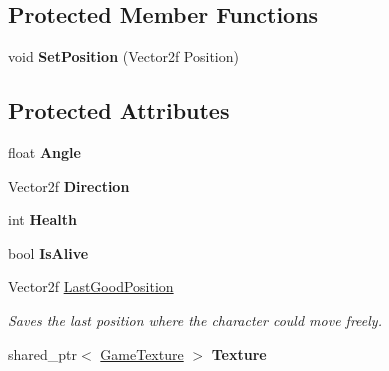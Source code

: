 \subsection*{Protected Member Functions}
\begin{DoxyCompactItemize}
\item 
\mbox{\label{class_engine_1_1_core_1_1_character_ad6e83da3df6620fedbe859022f68727f}} 
void {\bfseries Set\+Position} (Vector2f Position)
\end{DoxyCompactItemize}
\subsection*{Protected Attributes}
\begin{DoxyCompactItemize}
\item 
\mbox{\label{class_engine_1_1_core_1_1_character_ad98ac89b7c82b587306e83b5aa6acf07}} 
float {\bfseries Angle}
\item 
\mbox{\label{class_engine_1_1_core_1_1_character_aacac55c620345c41b3eb09f4abbd4318}} 
Vector2f {\bfseries Direction}
\item 
\mbox{\label{class_engine_1_1_core_1_1_character_a5f898cc76d7384b27f3105babb9ea27a}} 
int {\bfseries Health}
\item 
\mbox{\label{class_engine_1_1_core_1_1_character_a4b0c92ea505c26b00f1a4873bdf747b2}} 
bool {\bfseries Is\+Alive}
\item 
\mbox{\label{class_engine_1_1_core_1_1_character_ab749582f4376b908cdf23d6cc4ac2fe2}} 
Vector2f \hyperlink{class_engine_1_1_core_1_1_character_ab749582f4376b908cdf23d6cc4ac2fe2}{Last\+Good\+Position}
\begin{DoxyCompactList}\small\item\em Saves the last position where the character could move freely. \end{DoxyCompactList}\item 
\mbox{\label{class_engine_1_1_core_1_1_character_a289559b0eea38088ed1135ef8cf994dd}} 
shared\+\_\+ptr$<$ \hyperlink{class_engine_1_1_core_1_1_game_texture}{Game\+Texture} $>$ {\bfseries Texture}
\end{DoxyCompactItemize}


